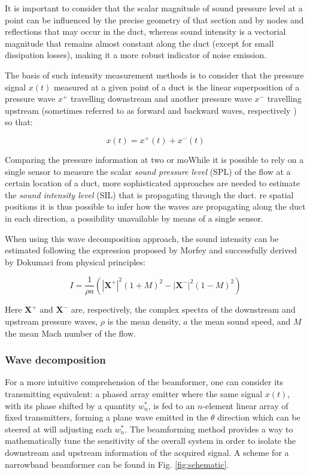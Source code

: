 It is important to consider that the scalar magnitude of sound pressure level at a point can be influenced by the precise geometry of that section and by nodes and reflections that may occur in the duct, whereas sound intensity is a vectorial magnitude that remains almost constant along the duct (except for small dissipation losses), making it a more robust indicator of noise emission.

The basis of such intensity measurement methods is to consider that the pressure signal $x(t)$ measured at a given point of a duct is the linear superposition of a pressure wave $x^+$ travelling downstream and another pressure wave $x^-$ travelling upstream (sometimes referred to as forward and backward waves, respectively \cite{pinero2000estimation}) so that:

\begin{equation}
  x(t)=x^+(t)+x^-(t)
\end{equation}

Comparing the pressure information at two or moWhile it is possible \cite{figurella2012noise} to rely on a single sensor to measure the scalar \emph{sound pressure level} (SPL) of the flow at a certain location of a duct, more sophisticated approaches are needed to estimate the \emph{sound intensity level} (SIL) that is propagating through the duct.
re spatial positions it is thus possible to infer how the waves are propagating along the duct in each direction, a possibility unavailable by means of a single sensor.

When using this wave decomposition approach, the sound intensity can be estimated following the expression proposed by Morfey \cite{morfey1971sound} and successfully derived by Dokumaci \cite{dokumaci2000calculation} from physical principles:

\begin{equation}\label{eq:intensity}
    I=\frac{1}{\rho a}\left(|\mathbf X^+ |^2(1+M)^2-|\mathbf X^- |^2(1-M)^2\right)
\end{equation}

Here $\mathbf X^+$ and $\mathbf X^-$ are, respectively, the complex spectra of the downstream and upstream pressure waves, $\rho$ is the mean density, $a$ the mean sound speed, and $M$ the mean Mach number of the flow.


\subsubsection{Wave decomposition}
For a more intuitive comprehension of the beamformer, one can consider its transmitting equivalent: a phased array emitter where the same signal $x(t)$, with its phase shifted by a quantity $w_n^*$, is fed to an $n$-element linear array of fixed transmitters, forming a plane wave emitted in the $\theta$ direction which can be steered at will adjusting each $w_n^*$.
The beamforming method provides a way to mathematically tune the sensitivity of the overall system in order to isolate the downstream and upstream information of the acquired signal. A scheme for a narrowband beamformer can be found in Fig. \ref{fig:schematic}.

